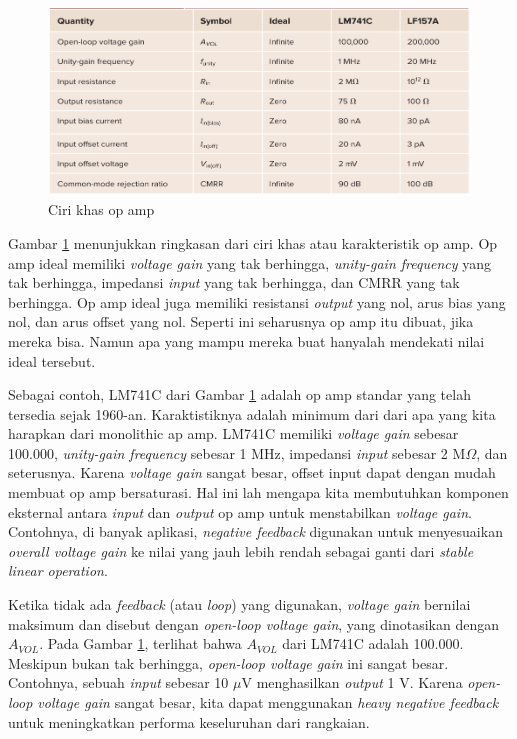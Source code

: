\begin{figure}
	\centering
	\includegraphics[width=\linewidth]{pic/tab:16.01}
	\caption{Ciri khas op amp}
	\label{tab:16.01}
\end{figure}

Gambar \ref{tab:16.01} menunjukkan ringkasan dari ciri khas atau karakteristik op amp. Op amp ideal memiliki \textit{voltage gain} yang tak berhingga, \textit{unity-gain frequency} yang tak berhingga, impedansi \textit{input} yang tak berhingga, dan CMRR yang tak berhingga. Op amp ideal juga memiliki resistansi \textit{output} yang nol, arus bias yang nol, dan arus offset yang nol. Seperti ini seharusnya op amp itu dibuat, jika mereka bisa. Namun apa yang mampu mereka buat hanyalah mendekati nilai ideal tersebut.

Sebagai contoh, LM741C dari Gambar \ref{tab:16.01} adalah op amp standar yang telah tersedia sejak 1960-an. Karaktistiknya adalah minimum dari dari apa yang kita harapkan dari monolithic ap amp. LM741C memiliki \textit{voltage gain} sebesar 100.000, \textit{unity-gain frequency} sebesar 1 MHz, impedansi \textit{input} sebesar 2 M$\Omega$, dan seterusnya. Karena \textit{voltage gain} sangat besar, offset input dapat dengan mudah membuat op amp bersaturasi. Hal ini lah mengapa kita membutuhkan komponen eksternal antara \textit{input} dan \textit{output} op amp untuk menstabilkan \textit{voltage gain}. Contohnya, di banyak aplikasi, \textit{negative feedback} digunakan untuk menyesuaikan \textit{overall voltage gain} ke nilai yang jauh lebih rendah sebagai ganti dari \textit{stable linear operation}.

Ketika tidak ada \textit{feedback} (atau \textit{loop}) yang digunakan, \textit{voltage gain} bernilai maksimum dan disebut dengan \textit{open-loop voltage gain}, yang dinotasikan dengan $ A_{VOL} $. Pada Gambar \ref{tab:16.01}, terlihat bahwa $ A_{VOL} $ dari LM741C adalah 100.000. Meskipun bukan tak berhingga, \textit{open-loop voltage gain} ini sangat besar. Contohnya, sebuah \textit{input} sebesar 10 $\mu$V menghasilkan \textit{output} 1 V. Karena \textit{open-loop voltage gain} sangat besar, kita dapat menggunakan \textit{heavy negative feedback} untuk meningkatkan performa keseluruhan dari rangkaian.

